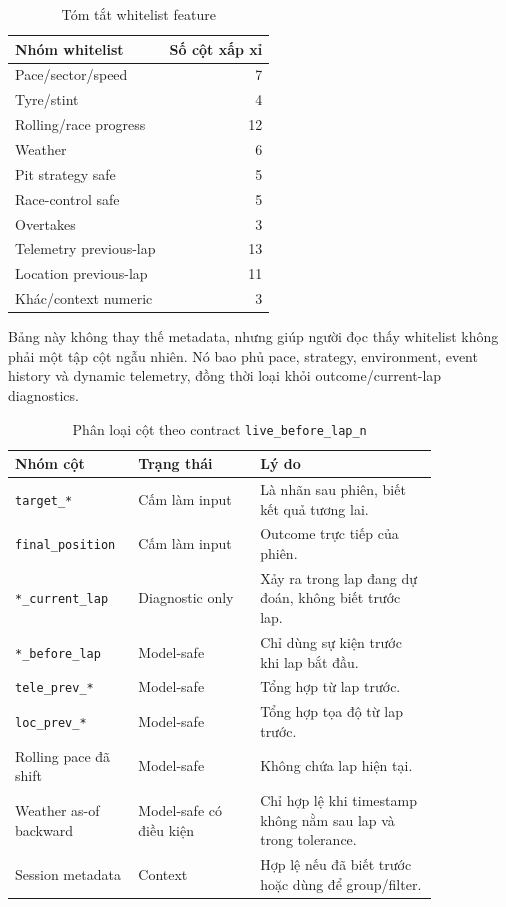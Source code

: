 \documentclass[conference]{IEEEtran}
\begin{document}
\begin{table}[htbp]
\caption{Tóm tắt whitelist feature}
\label{tab:whitelist}
\centering
\begin{tabular}{lr}
\toprule
Nhóm whitelist & Số cột xấp xỉ \\
\midrule
Pace/sector/speed & 7 \\
Tyre/stint & 4 \\
Rolling/race progress & 12 \\
Weather & 6 \\
Pit strategy safe & 5 \\
Race-control safe & 5 \\
Overtakes & 3 \\
Telemetry previous-lap & 13 \\
Location previous-lap & 11 \\
Khác/context numeric & 3 \\
\bottomrule
\end{tabular}
\end{table}

Bảng này không thay thế metadata, nhưng giúp người đọc thấy whitelist không phải một tập cột ngẫu nhiên. Nó bao phủ pace, strategy, environment, event history và dynamic telemetry, đồng thời loại khỏi outcome/current-lap diagnostics.

\begin{table}[htbp]
\caption{Phân loại cột theo contract \texttt{live\_before\_lap\_n}}
\label{tab:contract}
\centering
\begin{tabular}{p{0.20\linewidth}p{0.26\linewidth}p{0.38\linewidth}}
\toprule
Nhóm cột & Trạng thái & Lý do \\
\midrule
\texttt{target\_*} & Cấm làm input & Là nhãn sau phiên, biết kết quả tương lai. \\
\texttt{final\_position} & Cấm làm input & Outcome trực tiếp của phiên. \\
\texttt{*\_current\_lap} & Diagnostic only & Xảy ra trong lap đang dự đoán, không biết trước lap. \\
\texttt{*\_before\_lap} & Model-safe & Chỉ dùng sự kiện trước khi lap bắt đầu. \\
\texttt{tele\_prev\_*} & Model-safe & Tổng hợp từ lap trước. \\
\texttt{loc\_prev\_*} & Model-safe & Tổng hợp tọa độ từ lap trước. \\
Rolling pace đã shift & Model-safe & Không chứa lap hiện tại. \\
Weather as-of backward & Model-safe có điều kiện & Chỉ hợp lệ khi timestamp không nằm sau lap và trong tolerance. \\
Session metadata & Context & Hợp lệ nếu đã biết trước hoặc dùng để group/filter. \\
\bottomrule
\end{tabular}
\end{table}
\end{document}
